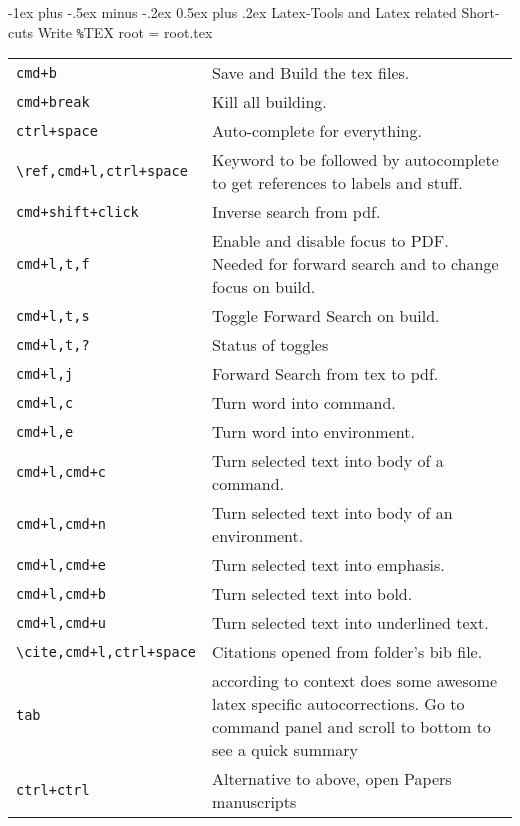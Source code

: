 \documentclass[12pt,landscape]{article}
\makeatletter
\renewcommand{\section}{\@startsection{section}{1}{0mm}%
                                {-1ex plus -.5ex minus -.2ex}%
                                {0.5ex plus .2ex}%
                                {\normalfont\large\bfseries}}
\makeatother
\begin{document}
\begin{multicols}{2}
\section{Latex-Tools and Latex related Short-cuts}
\label{Latex}
Write \verb!%!TEX root = root.tex
\begin{tabular}{p{3in}  p{6in}}
\verb!cmd+b!           & Save and Build the tex files. \\
\verb!cmd+break!       & Kill all building. \\
\verb!ctrl+space!       & Auto-complete for everything. \\
\verb!\ref,cmd+l,ctrl+space! & Keyword to be followed by autocomplete to get references to labels and stuff. \\
\verb!cmd+shift+click!  & Inverse search from pdf. \\
\verb!cmd+l,t,f!       & Enable and disable focus to PDF. Needed for forward search and to change focus on build. \\
\verb!cmd+l,t,s!      & Toggle Forward Search on build. \\
\verb!cmd+l,t,?!      & Status of toggles \\
\verb!cmd+l,j!      & Forward Search from tex to pdf. \\
\verb!cmd+l,c!      & Turn word into command. \\
\verb!cmd+l,e!      & Turn word into environment. \\
\verb!cmd+l,cmd+c!    & Turn selected text into body of a command. \\
\verb!cmd+l,cmd+n!    & Turn selected text into body of an environment. \\
\verb!cmd+l,cmd+e!    & Turn selected text into emphasis. \\
\verb!cmd+l,cmd+b!    & Turn selected text into bold. \\
\verb!cmd+l,cmd+u!    & Turn selected text into underlined text. \\
\verb!\cite,cmd+l,ctrl+space! & Citations opened from folder's bib file. \\
\verb!tab!          & according to context does some awesome latex specific autocorrections. Go to command panel and scroll to bottom to see a quick summary\\
\verb!ctrl+ctrl!        & Alternative to above, open Papers manuscripts
\end{tabular}
\end{multicols}
\newpage
\end{document}
